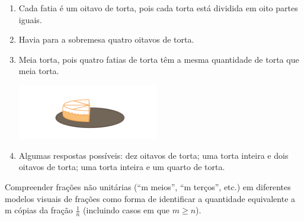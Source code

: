 \begin{multicols}{2}
\begin{orientacoes}
\end{orientacoes}

\begin{solucao}{}{}
\begin{enumerate} [\quad a)] %
    \item       Cada fatia é um oitavo de torta, pois cada torta está dividida em oito partes iguais.
    \item       Havia para a sobremesa quatro oitavos de torta.
    \item       Meia torta, pois quatro fatias de torta têm a mesma quantidade de torta que meia torta.

  \begin{center}
  \includegraphics[width=175pt, keepaspectratio]{../figuras/licao02/ativ3_resposta.png}
  \end{center}

    \item       Algumas respostas possíveis: dez oitavos de torta;  uma torta inteira e dois oitavos de torta; uma torta inteira e um quarto de torta.
\end{enumerate} %

\end{solucao}


\begin{objetivos}{}{}

  Compreender frações não unitárias (``m meios'', ``m terços'', etc.) em diferentes modelos visuais de frações como forma de identificar a quantidade equivalente a m cópias da fração $\frac{1}{n}$ (incluindo casos em que $m \geq n$).
\end{objetivos}


\end{multicols}
